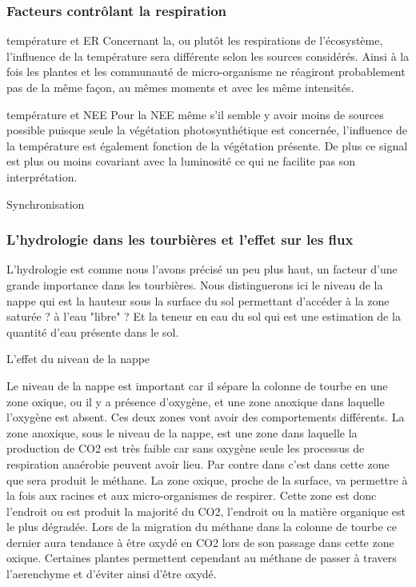 
\subsubsection{Facteurs contrôlant la respiration}
température et ER
Concernant la, ou plutôt les respirations de l'écosystème, l'influence de la température sera différente selon les sources considérés.
Ainsi à la fois les plantes et les communauté de micro-organisme ne réagiront probablement pas de la même façon, au mêmes moments et avec les même intensités.

température et NEE
Pour la NEE même s'il semble y avoir moins de sources possible puisque seule la végétation photosynthétique est concernée, l'influence de la température est également fonction de la végétation présente.
De plus ce signal est plus ou moins covariant avec la luminosité ce qui ne facilite pas son interprétation.

Synchronisation


\subsubsection{L'hydrologie dans les tourbières et l'effet sur les flux}
L'hydrologie est comme nous l'avons précisé un peu plus haut, un facteur d'une grande importance dans les tourbières.
Nous distinguerons ici le niveau de la nappe qui est la hauteur sous la surface du sol permettant d'accéder à la zone saturée ? à l'eau "libre" ?
Et la teneur en eau du sol qui est une estimation de la quantité d'eau présente dans le sol.

L'effet du niveau de la nappe \par
Le niveau de la nappe est important car il sépare la colonne de tourbe en une zone oxique, ou il y a présence d'oxygène, et une zone anoxique dans laquelle l'oxygène est absent.
Ces deux zones vont avoir des comportements différents.
La zone anoxique, sous le niveau de la nappe, est une zone dans laquelle la production de CO2 est très faible car sans oxygène seule les processus de respiration anaérobie peuvent avoir lieu.
Par contre dans c'est dans cette zone que sera produit le méthane.
La zone oxique, proche de la surface, va permettre à la fois aux racines et aux micro-organismes de respirer.
Cette zone est donc l'endroit ou est produit la majorité du CO2, l'endroit ou la matière organique est le plus dégradée.
Lors de la migration du méthane dans la colonne de tourbe ce dernier aura tendance à être oxydé en CO2 lors de son passage dans cette zone oxique.
Certaines plantes permettent cependant au méthane de passer à travers l'aerenchyme et d'éviter ainsi d'être oxydé.

